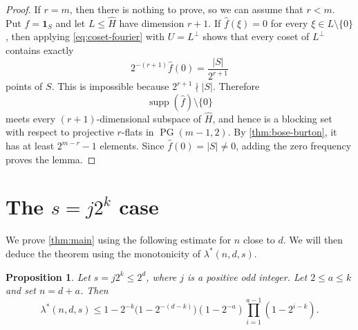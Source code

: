 \documentclass[reqno]{amsart}
\newtheorem{proposition}[theorem]{Proposition}
\theoremstyle{definition}
\theoremstyle{remark}
\newcommand{\one}{\mathbf 1}
\DeclareMathOperator{\supp}{supp}
\begin{document}
\begin{proof}
If $r=m$, then there is nothing to prove, so we can assume that $r < m$. 
Put $f=\one_S$ and let $L\le\widehat H$
have dimension $r+1$.  If
$\widehat f(\xi)=0$ for every $\xi\in L\setminus\{0\}$, then applying
\eqref{eq:coset-fourier} with $U=L^\perp$ shows that every coset of
$L^\perp$ contains exactly
\[
  2^{-(r+1)}\widehat f(0)=\frac{|S|}{2^{r+1}}
\]
points of $S$.  This is impossible because $2^{r+1}\nmid |S|$.
Therefore
\[
  \supp(\widehat f)\setminus\{0\}
\]
meets every $(r+1)$-dimensional subspace of $\widehat H$, and hence is a
blocking set with respect to projective $r$-flats in
$\operatorname{PG}(m-1,2)$.  By \cref{thm:bose-burton}, it has at least
$2^{m-r}-1$ elements.  Since $\widehat f(0)=|S|\ne0$, adding the zero
frequency proves the lemma.
\end{proof}


\section{The $s=j2^k$ case}\label{sec:main-proof}

We prove \cref{thm:main} using the following 
estimate for $n$ close to $d$. We will then deduce the theorem using the monotonicity of $\lambda^*(n,d,s)$.

\begin{proposition}\label{prop:finite}
Let $s=j2^k\le2^d$, where $j$ is a positive odd integer. Let
$2\le a\le k$ and set
$n=d+a$. Then
\[
  \lambda^*(n,d,s)
  \le 1-2^{-k}\bigl(1-2^{-(d-k)}\bigr)(1-2^{-a})
  \prod_{i=1}^{a-1}(1-2^{i-k}).
\]
\end{proposition}
\end{document}
